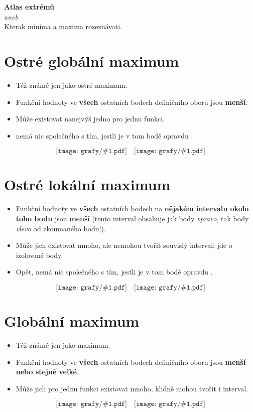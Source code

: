 \documentclass[12pt,a4paper]{article}
\def\graf#1{\texttt{[image: grafy/\#1.pdf]}}
\begin{document}
\begin{center}
{\LARGE\bfseries Atlas extrémů}\\[1mm]
\Large\emph{aneb}\\[1mm]
{\Large Kterak minima a maxima rozeznávati.}
\end{center}

\section{Ostré globální maximum}
\begin{itemize}
    \item Též známé jen jako ostré maximum.
    \item Funkční hodnoty ve \textbf{všech} ostatních bodech definičního oboru jsou \textbf{menší}.
    \item Může existovat nanejvýš jedno pro jednu funkci.
    \item {} nemá nic společného s tím, jestli je v tom bodě opravdu .
\end{itemize}
\[ \graf{glob_ostre_1}\quad\graf{glob_ostre_2} \]


\section{Ostré lokální maximum}
\begin{itemize}
    \item Funkční hodnoty ve \textbf{všech} ostatních bodech na \textbf{nějakém intervalu okolo toho bodu} jsou \textbf{menší} (tento interval obsahuje jak body \emph{vpravo}, tak body \emph{vlevo} od zkoumaného bodu!).
    \item Může jich existovat mnoho, ale nemohou tvořit souvislý interval;  jde o izolované body.
    \item Opět,  nemá nic společného s tím, jestli je v tom bodě opravdu .
\end{itemize}
\[ \graf{lok_ostre_1}\quad\graf{lok_ostre_2} \]


\section{Globální maximum}
\begin{itemize}
    \item Též známé jen jako maximum.
    \item Funkční hodnoty ve \textbf{všech} ostatních bodech definičního oboru jsou \textbf{menší nebo stejně velké}.
    \item Může jich pro jednu funkci existovat mnoho, klidně mohou tvořit i interval.
\end{itemize}
\[ \graf{glob_neostre_1}\quad\graf{glob_neostre_2} \]
\end{document}
